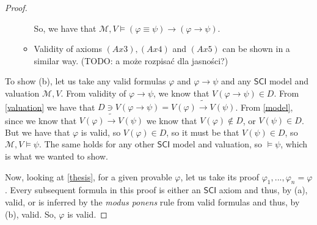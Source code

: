 \documentclass{article}
\theoremstyle{definition}
\theoremstyle{definition}
\theoremstyle{definition}
\newcommand*{\id}{\equiv}
\newcommand*{\ra}{\rightarrow}
\newcommand{\SCI}{$\mathsf{SCI}$\xspace}
\begin{document}
\begin{proof}
\begin{itemize}
\begin{itemize}
                        So, we have that $\mathcal{M}, V \models (\varphi \id \psi) \ra (\varphi \ra
                            \psi)$.

                  \item Validity of axioms $(Ax3), (Ax4)$ and $(Ax5)$ can be shown in a similar way.
                            {\color{red}(TODO: a może rozpisać dla jasności?)}
              \end{itemize}
    \end{itemize}

    To show (b), let us take any valid formulas $\varphi$ and $\varphi \ra \psi$ and
    any \SCI model and valuation $\mathcal{M}, V$. From validity of $\varphi \ra
        \psi$, we know that $V(\varphi \ra \psi) \in D$. From \cref{valuation} we have
    that $D \ni V(\varphi \ra \psi) = V(\varphi) \tilde{\ra} V(\psi)$. From
    \cref{model}, since we know that $V(\varphi) \tilde{\ra} V(\psi)$ we know that
    $V(\varphi) \not \in D$, or $V(\psi) \in D$. But we have that $\varphi$ is
    valid, so $V(\varphi) \in D$, so it must be that $V(\psi) \in D$, so
    $\mathcal{M}, V \models \psi$. The same holds for any other \SCI model and
    valuation, so $\models \psi$, which is what we wanted to show.

    Now, looking at \cref{thesis}, for a given provable $\varphi$, let us take its
    proof $\varphi_1, ..., \varphi_n = \varphi$. Every subsequent formula in this
    proof is either an \SCI axiom and thus, by (a), valid, or is inferred by the
    \emph{modus ponens} rule from valid formulas and thus, by (b), valid. So,
    $\varphi$ is valid.
\end{proof}
\end{document}
